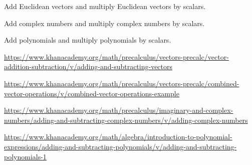 
\begin{readinessAssuranceOutcomes}
\item Add Euclidean vectors and multiply Euclidean vectors by scalars.
\item Add complex numbers and multiply complex numbers by scalars.
\item Add polynomials and multiply polynomials by scalars.
\end{readinessAssuranceOutcomes}

\begin{readinessAssuranceResources}
\item \url{https://www.khanacademy.org/math/precalculus/vectors-precalc/vector-addition-subtraction/v/adding-and-subtracting-vectors}
\item \url{https://www.khanacademy.org/math/precalculus/vectors-precalc/combined-vector-operations/v/combined-vector-operations-example}
\item \url{https://www.khanacademy.org/math/precalculus/imaginary-and-complex-numbers/adding-and-subtracting-complex-numbers/v/adding-complex-numbers}
\item \url{https://www.khanacademy.org/math/algebra/introduction-to-polynomial-expressions/adding-and-subtracting-polynomials/v/adding-and-subtracting-polynomials-1}
\end{readinessAssuranceResources}





